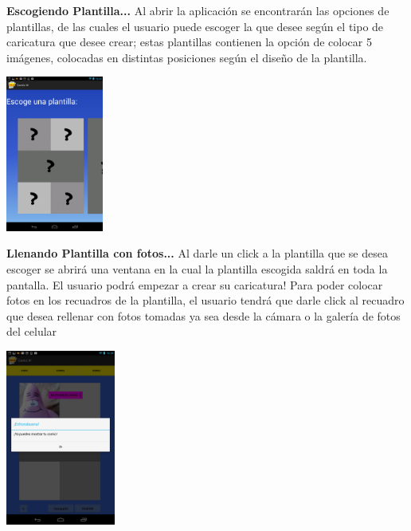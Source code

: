 \documentclass[12pt]{report}
\begin{document}
\begingroup
		\large{
			\textbf{
				Escogiendo Plantilla...
				\newline
				\newline
			}
		}
	\endgroup
Al abrir la aplicación se encontrarán las opciones de plantillas, de las cuales el usuario puede escoger la que desee según el tipo de caricatura que desee crear; estas plantillas contienen la opción de colocar 5 imágenes, colocadas en distintas posiciones según el diseño de la plantilla.
				\newline
				\newline
	\begin{center}
		\begingroup
			\includegraphics[width=0.24\textwidth]{imagenes_usuario/plantillas.png}
		\endgroup
	\end{center}


\begingroup
		\large{
			\textbf{
				Llenando Plantilla con fotos...
				\newline
				\newline
			}
		}
	\endgroup
Al darle un click a la plantilla que se desea escoger se abrirá una ventana en la cual la plantilla escogida saldrá en toda la pantalla. El usuario podrá empezar a crear su caricatura!
Para poder colocar fotos en los recuadros de la plantilla, el usuario tendrá que darle click al recuadro que desea rellenar con fotos tomadas ya sea desde la cámara o la galería de fotos del celular
\newline
\newline
	\begin{center}
		\begingroup
			\includegraphics[width=0.27\textwidth]{imagenes_usuario/camara.png}

		\endgroup
	\end{center}
\end{document}
